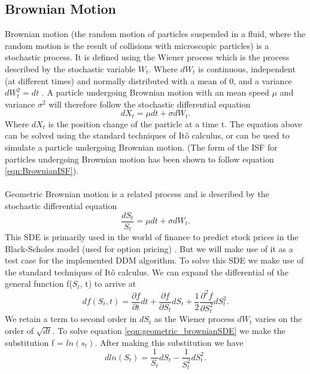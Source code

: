 \documentclass[11pt]{article}
\begin{document}
\subsection{Brownian Motion}
Brownian motion (the random motion of particles suspended in a fluid, where the random motion is the result of collisions with microscopic particles) is a stochastic process. It is defined using the Wiener process which is the process described by the stochastic variable $W_t$. Where $dW_t$ is continuous, independent (at different times) and normally distributed with a mean of 0, and a variance $dW_t^2 = dt$ \cite{sde}. A particle undergoing Brownian motion with an mean speed $\mu$ and variance $\sigma^2$ will therefore follow the stochastic differential equation
\begin{equation}
\label{eqn:brownianSDE}
dX_t = \mu dt + \sigma dW_t.
\end{equation}
Where $dX_t$ is the position change of the particle at a time t. The equation above can be solved using the standard techniques of Itô calculus, or can be used to simulate a particle undergoing Brownian motion. (The form of the ISF for particles undergoing Brownian motion has been shown to follow equation \ref{eqn:BrownianISF}).
\\\\
Geometric Brownian motion is a related process and is described by the stochastic differential equation 
\begin{equation}
\label{eqn:geometric_brownianSDE}
\frac{dS_t}{S_t} = \mu dt + \sigma dW_t.
\end{equation}
This SDE is primarily used in the world of finance to predict stock prices in the Black-Scholes model (used for option pricing) \cite{sde}. But we will make use of it as a test case for the implemented DDM algorithm. To solve this SDE we make use of the standard techniques of Itô calculus. We can expand the differential of the general function f($S_t$, t) to arrive at
\begin{equation}
df(S_t, t) = \frac{\partial f}{\partial t} dt + \frac{\partial f}{\partial S_t} dS_t + \frac{1}{2} \frac{\partial^2 f}{\partial S_t^2} dS_t^2.
\end{equation}
We retain a term to second order in $dS_t$ as the Wiener process $dW_t$ varies on the order of $\sqrt{dt}$. To solve equation \ref{eqn:geometric_brownianSDE} we make the substitution f = $ln(s_t)$. After making this substitution we have
\begin{equation}
dln(S_t) = \frac{1}{S_t}dS_t  - \frac{1}{S_t^2}dS_t^2.
\end{equation}
\end{document}
